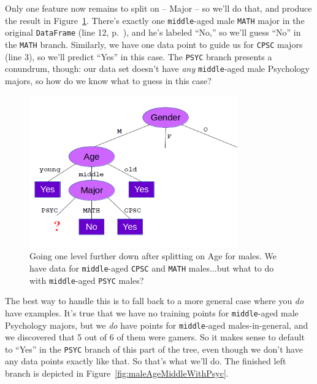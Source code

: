 Only one feature now remains to split on -- \textsf{Major} -- so we'll do that,
and produce the result in Figure~\ref{fig:maleAgeMiddle}. There's exactly one
\texttt{middle}-aged male \texttt{MATH} major in the original
\texttt{DataFrame} (line 12, p.~\pageref{vgDataSet}), and he's labeled ``No,''
so we'll guess ``No'' in the \texttt{MATH} branch. Similarly, we have one data
point to guide us for \texttt{CPSC} majors (line 3), so we'll predict ``Yes''
in this case. The \texttt{PSYC} branch presents a conundrum, though: our data
set doesn't have \textit{any} \texttt{middle}-aged male Psychology majors, so
how do we know what to guess in this case?

\begin{figure}[ht]
\centering
\includegraphics[width=0.8\textwidth]{maleAgeMiddle.png}
\caption{Going one level further down after splitting on \textsf{Age} for
males. We have data for \texttt{middle}-aged \texttt{CPSC} and \texttt{MATH}
males...but what to do with \texttt{middle}-aged \texttt{PSYC} males?}
\label{fig:maleAgeMiddle}
\end{figure}

The best way to handle this is to fall back to a more general case where you
\textit{do} have examples. It's true that we have no training points for
\texttt{middle}-aged male Psychology majors, but we \textit{do} have points for
\texttt{middle}-aged males-in-general, and we discovered that 5 out of 6 of
them were gamers. So it makes sense to default to ``Yes'' in the \texttt{PSYC}
branch of this part of the tree, even though we don't have any data points
exactly like that. So that's what we'll do. The finished left branch is
depicted in Figure~\ref{fig:maleAgeMiddleWithPsyc}.

